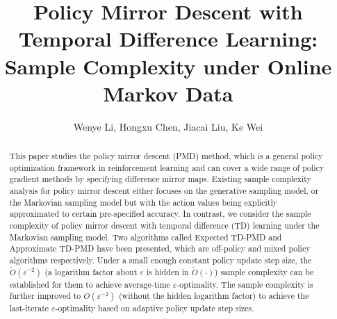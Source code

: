 \documentclass[10pt]{article}
\title{Policy Mirror Descent with Temporal Difference Learning: Sample Complexity under Online Markov Data}
\author{Wenye Li, Hongxu Chen, Jiacai Liu, Ke Wei}
\affil{School of Data Science, Fudan University, Shanghai, China.}
\theoremstyle{plain}
\theoremstyle{definition}
\begin{document}
\maketitle
\begin{abstract}
    This paper studies the policy mirror descent (PMD) method, which is a general policy optimization framework in reinforcement learning and can cover a wide range of policy gradient methods by specifying difference mirror maps. Existing sample complexity analysis for policy mirror descent either focuses on the generative sampling  model, or the Markovian sampling model but with the action values being explicitly approximated to certain pre-specified accuracy. In contrast, we consider the sample complexity of policy mirror descent with temporal difference (TD) learning under the Markovian sampling model. Two algorithms called Expected TD-PMD and Approximate TD-PMD have been presented, which are off-policy and mixed policy algorithms respectively. Under a small enough constant policy update step size, the $\tilde{O}(\varepsilon^{-2})$ (a logarithm factor about $\varepsilon$ is hidden in $\tilde{O}(\cdot)$) sample complexity can be established for them to achieve average-time $\varepsilon$-optimality. The sample complexity is further improved to $O(\varepsilon^{-2})$ (without the hidden logarithm factor) to achieve the last-iterate $\varepsilon$-optimality based on adaptive policy update step sizes.
\end{abstract}
\end{document}
